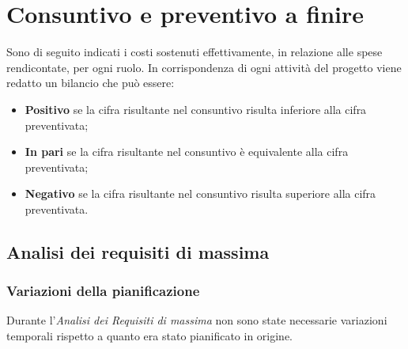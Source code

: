 \section{Consuntivo e preventivo a finire}
Sono di seguito indicati i costi sostenuti effettivamente, in relazione alle spese rendicontate, per ogni ruolo.
In corrispondenza di ogni attività del progetto viene redatto un bilancio che può essere:
\begin{itemize}
	\item \textbf{Positivo} se la cifra risultante nel consuntivo risulta inferiore alla cifra preventivata;
	\item \textbf{In pari} se la cifra risultante nel consuntivo è equivalente alla cifra preventivata;	
	\item \textbf{Negativo} se la cifra risultante nel consuntivo risulta superiore alla cifra preventivata.
\end{itemize}
	\subsection{Analisi dei requisiti di massima}
		\subsubsection{Variazioni della pianificazione}
		Durante l'\textit{Analisi dei Requisiti di massima} non sono state necessarie variazioni temporali rispetto a quanto era stato pianificato in origine.
